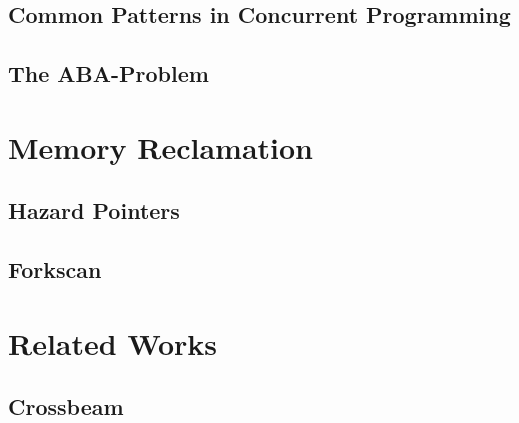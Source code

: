 \subsection{Common Patterns in Concurrent Programming\label{sec:common-patterns}}
\lorem{}

\subsection{The ABA-Problem\label{sec:aba-problem}}


\section{Memory Reclamation}
\lorem{}

\subsection{Hazard Pointers\label{sec:hazard-pointers}}
\lorem{}

\subsection{Forkscan\label{sec:forkscan}}
\lorem{}


\section{Related Works}
\lorem{}

\subsection{Crossbeam}
\lorem{}
